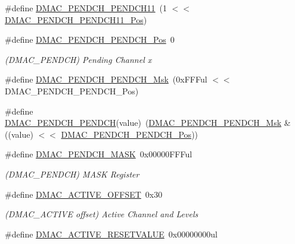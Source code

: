\begin{DoxyCompactItemize}
\#define \mbox{\hyperlink{group___s_a_m_d21___d_m_a_c_ga1db91d30b44533889b97a57f055c17ea}{D\+M\+A\+C\+\_\+\+P\+E\+N\+D\+C\+H\+\_\+\+P\+E\+N\+D\+C\+H11}}~(1 $<$$<$ \mbox{\hyperlink{group___s_a_m_d21___d_m_a_c_gabd8e958ed451c4deac350423d663342a}{D\+M\+A\+C\+\_\+\+P\+E\+N\+D\+C\+H\+\_\+\+P\+E\+N\+D\+C\+H11\+\_\+\+Pos}})
\item 
\#define \mbox{\hyperlink{group___s_a_m_d21___d_m_a_c_ga149b3b56d6ec1a11b668b5380f5a800b}{D\+M\+A\+C\+\_\+\+P\+E\+N\+D\+C\+H\+\_\+\+P\+E\+N\+D\+C\+H\+\_\+\+Pos}}~0
\begin{DoxyCompactList}\small\item\em (D\+M\+A\+C\+\_\+\+P\+E\+N\+D\+CH) Pending Channel x \end{DoxyCompactList}\item 
\#define \mbox{\hyperlink{group___s_a_m_d21___d_m_a_c_ga56da3ad2363c11da646085857cd7a3da}{D\+M\+A\+C\+\_\+\+P\+E\+N\+D\+C\+H\+\_\+\+P\+E\+N\+D\+C\+H\+\_\+\+Msk}}~(0x\+F\+F\+Ful $<$$<$ D\+M\+A\+C\+\_\+\+P\+E\+N\+D\+C\+H\+\_\+\+P\+E\+N\+D\+C\+H\+\_\+\+Pos)
\item 
\#define \mbox{\hyperlink{group___s_a_m_d21___d_m_a_c_gab27c1642abe8d94d8a7a529d49ce72a8}{D\+M\+A\+C\+\_\+\+P\+E\+N\+D\+C\+H\+\_\+\+P\+E\+N\+D\+CH}}(value)~(\mbox{\hyperlink{group___s_a_m_d21___d_m_a_c_ga56da3ad2363c11da646085857cd7a3da}{D\+M\+A\+C\+\_\+\+P\+E\+N\+D\+C\+H\+\_\+\+P\+E\+N\+D\+C\+H\+\_\+\+Msk}} \& ((value) $<$$<$ \mbox{\hyperlink{group___s_a_m_d21___d_m_a_c_ga149b3b56d6ec1a11b668b5380f5a800b}{D\+M\+A\+C\+\_\+\+P\+E\+N\+D\+C\+H\+\_\+\+P\+E\+N\+D\+C\+H\+\_\+\+Pos}}))
\item 
\#define \mbox{\hyperlink{group___s_a_m_d21___d_m_a_c_ga8c3dbf6e225ad223cbc54b60b5fbf5b3}{D\+M\+A\+C\+\_\+\+P\+E\+N\+D\+C\+H\+\_\+\+M\+A\+SK}}~0x00000\+F\+F\+Ful
\begin{DoxyCompactList}\small\item\em (D\+M\+A\+C\+\_\+\+P\+E\+N\+D\+CH) M\+A\+SK Register \end{DoxyCompactList}\item 
\#define \mbox{\hyperlink{group___s_a_m_d21___d_m_a_c_ga5f977e85f651efb68d3fec5fcf2c5877}{D\+M\+A\+C\+\_\+\+A\+C\+T\+I\+V\+E\+\_\+\+O\+F\+F\+S\+ET}}~0x30
\begin{DoxyCompactList}\small\item\em (D\+M\+A\+C\+\_\+\+A\+C\+T\+I\+VE offset) Active Channel and Levels \end{DoxyCompactList}\item 
\#define \mbox{\hyperlink{group___s_a_m_d21___d_m_a_c_gafe8aed5d737179d2eadb6bf00646f19f}{D\+M\+A\+C\+\_\+\+A\+C\+T\+I\+V\+E\+\_\+\+R\+E\+S\+E\+T\+V\+A\+L\+UE}}~0x00000000ul
$$
\end{DoxyCompactItemize}

